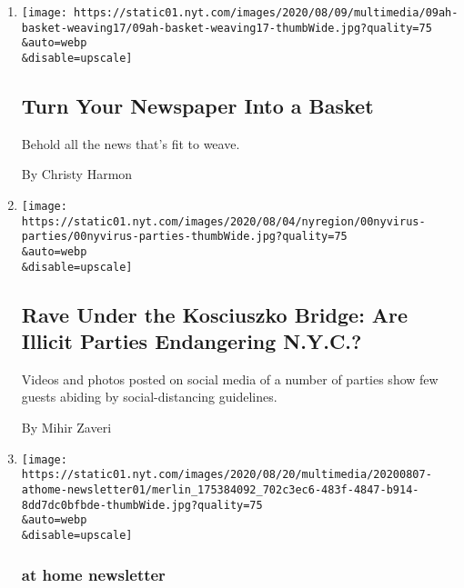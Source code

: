 \begin{enumerate}
\def\labelenumi{\arabic{enumi}.}
\item
  \href{/2020/08/08/at-home/coronavirus-newspaper-basket.html}{}

  \texttt{[image: https://static01.nyt.com/images/2020/08/09/multimedia/09ah-basket-weaving17/09ah-basket-weaving17-thumbWide.jpg?quality=75\\\&auto=webp\\\&disable=upscale]}

  \hypertarget{turn-your-newspaper-into-a-basket}{%
  \subsection{Turn Your Newspaper Into a
  Basket}\label{turn-your-newspaper-into-a-basket}}

  Behold all the news that's fit to weave.

  By Christy Harmon
\item
  \href{/2020/08/08/nyregion/nyc-illegal-parties.html}{}

  \texttt{[image: https://static01.nyt.com/images/2020/08/04/nyregion/00nyvirus-parties/00nyvirus-parties-thumbWide.jpg?quality=75\\\&auto=webp\\\&disable=upscale]}

  \hypertarget{rave-under-the-kosciuszko-bridge-are-illicit-parties-endangering-nyc}{%
  \subsection{Rave Under the Kosciuszko Bridge: Are Illicit Parties
  Endangering
  N.Y.C.?}\label{rave-under-the-kosciuszko-bridge-are-illicit-parties-endangering-nyc}}

  Videos and photos posted on social media of a number of parties show
  few guests abiding by social-distancing guidelines.

  By Mihir Zaveri
\item
  \href{/2020/08/07/at-home/newsletter.html}{}

  \texttt{[image: https://static01.nyt.com/images/2020/08/20/multimedia/20200807-athome-newsletter01/merlin\_175384092\_702c3ec6-483f-4847-b914-8dd7dc0bfbde-thumbWide.jpg?quality=75\\\&auto=webp\\\&disable=upscale]}

  \hypertarget{at-home-newsletter}{%
  \subsubsection{at home newsletter}\label{at-home-newsletter}}

  \hypertarget{treating-our-shared-world-as-an-extension-of-our-homes}{%
}
\end{enumerate}
